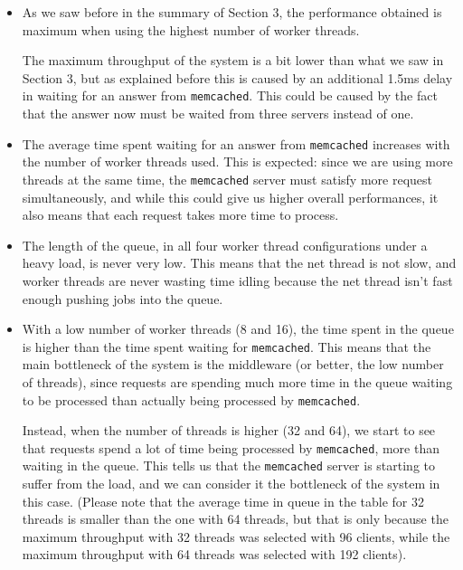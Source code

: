 \documentclass[11pt,a4paper]{article}
\renewcommand{\t}[1]{%
	{\texttt{#1}}}
\begin{document}
\begin{itemize}
	\item As we saw before in the summary of Section 3, the performance obtained is maximum
		when using the highest number of worker threads.

		The maximum throughput of the system is a bit lower than what we saw in
		Section 3, but as explained before this is caused by an additional
		1.5ms delay in waiting for an answer from \t{memcached}.  This could be
		caused by the fact that the answer now must be waited from three
		servers instead of one.

	\item The average time spent waiting for an answer from \t{memcached} increases with 
		the number of worker threads used. This is expected: since we are using
		more threads at the same time, the \t{memcached} server must satisfy more
		request simultaneously, and while this could give us higher overall performances, 
		it also means that each request takes more time to process. 

	\item The length of the queue, in all four worker thread configurations under
		a heavy load, is never very low.
		This means that the net thread is not slow, and worker threads are never wasting time
		idling because the net thread isn't fast enough pushing jobs into the queue.

	\item With a low number of worker threads (8 and 16), the time spent in the queue is 
		higher than the time spent waiting for \t{memcached}. This means that the 
		main bottleneck of the system is the middleware (or better, the low
		number of threads), since requests are spending
		much more time in the queue waiting to be processed than actually being 
		processed by \t{memcached}.

		Instead, when the number of threads is higher (32 and 64), we start to see that
		requests spend a lot of time being processed by \t{memcached}, more than 
		waiting in the queue. This tells us that the \t{memcached} server is starting
		to suffer from the load, and we can consider it the bottleneck of the system
		in this case. (Please note that the average time in queue in the table for 32
		threads is smaller than the one with 64 threads, but that is only because
		the maximum throughput with 32 threads was selected with 96 clients, while 
		the maximum throughput with 64 threads was selected with 192 clients).

\end{itemize}
\end{document}
